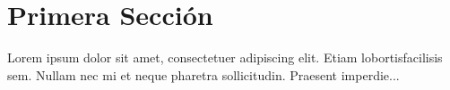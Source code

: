 \documentclass{article}
\begin{document}
\tableofcontents
 
\section{Primera Sección}
 
Lorem ipsum dolor sit amet, consectetuer adipiscing elit. Etiam lobortisfacilisis sem. Nullam nec mi et neque pharetra sollicitudin. Praesent imperdie...
 
\clearpage
\mbox{}
 
 
\printnomenclature
\end{document}
